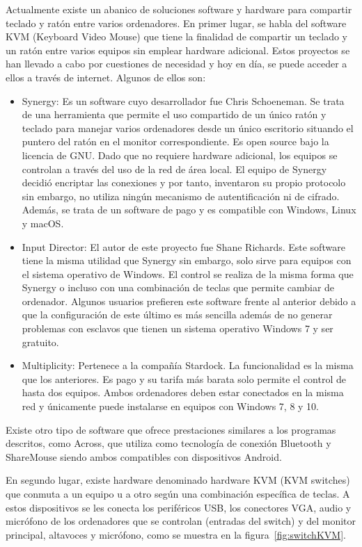 Actualmente existe un abanico de soluciones software y hardware para compartir teclado y ratón entre varios ordenadores. En primer lugar, se habla del software KVM (Keyboard Video Mouse) que tiene la finalidad de compartir un teclado y un ratón entre varios equipos sin emplear hardware adicional. Estos proyectos se han llevado a cabo por cuestiones de necesidad y hoy en día, se puede acceder a ellos a través de internet. Algunos de ellos son:

\begin{itemize}
    \item Synergy: Es un software cuyo desarrollador fue Chris Schoeneman. Se trata de una herramienta que permite el uso compartido de un único ratón y teclado para manejar varios ordenadores desde un único escritorio situando el puntero del ratón en el monitor correspondiente. Es open source bajo la licencia de GNU. Dado que no requiere hardware adicional, los equipos se controlan a través del uso de la red de área local. El equipo de Synergy decidió encriptar las conexiones y por tanto, inventaron su propio protocolo sin embargo, no utiliza ningún mecanismo de autentificación ni de cifrado. Además, se trata de un software de pago y es compatible con Windows, Linux y macOS.
    \item Input Director: El autor de este proyecto fue Shane Richards. Este software tiene la misma utilidad que Synergy sin embargo, solo sirve para equipos con el sistema operativo de Windows. El control se realiza de la misma forma que Synergy o incluso con una combinación de teclas que permite cambiar de ordenador. Algunos usuarios prefieren este software frente al anterior debido a que la configuración de este último es más sencilla además de no generar problemas con esclavos que tienen un sistema operativo Windows 7 y ser gratuito.
    \item Multiplicity: Pertenece a la compañía Stardock. La funcionalidad es la misma que los anteriores. Es pago y su tarifa más barata solo permite el control de hasta dos equipos. Ambos ordenadores deben estar conectados en la misma red y únicamente puede instalarse en equipos con Windows 7, 8 y 10.
\end{itemize}

Existe otro tipo de software que ofrece prestaciones similares a los programas descritos, como Across, que utiliza como tecnología de conexión Bluetooth y ShareMouse siendo ambos compatibles con dispositivos Android.

En segundo lugar, existe hardware denominado hardware KVM (KVM switches) que conmuta a un equipo u a otro según una combinación específica de teclas. A estos dispositivos se les conecta los periféricos USB, los conectores VGA, audio y micrófono de los ordenadores que se controlan (entradas del switch) y del monitor principal, altavoces y micrófono, como se muestra en la figura~\ref{fig:switchKVM}.

